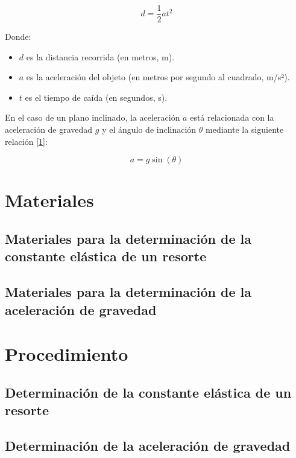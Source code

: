 \documentclass{article}
\begin{document}
\begin{multicols}{2}
            \begin{equation}
                d = \frac{1}{2} a t^2
            \end{equation}

        Donde:
            \begin{itemize}
                \item $d$ es la distancia recorrida (en metros, m).
                \item $a$ es la aceleración del objeto (en metros por segundo al cuadrado, m/s²).
                \item $t$ es el tiempo de caída (en segundos, s).
            \end{itemize}

        En el caso de un plano inclinado, la aceleración $a$ está relacionada con la aceleración de 
        gravedad $g$ y el ángulo de inclinación $\theta$ mediante la siguiente relación \ref{1}:

            \begin{equation}
                a = g \sin(\theta)
            \end{equation}
        
\section{Materiales}

    \subsection{Materiales para la determinación de la constante elástica de un resorte}

    \subsection{Materiales para la determinación de la aceleración de gravedad}

\section{Procedimiento}

\subsection{Determinación de la constante elástica de un resorte}

\subsection{Determinación de la aceleración de gravedad}


\end{multicols}
\end{document}
